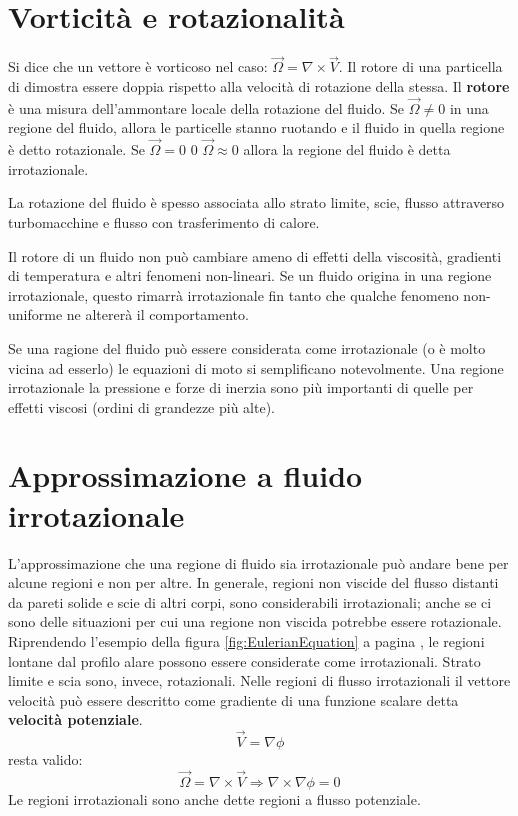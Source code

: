 \section{Vorticità e rotazionalità}
Si dice che un vettore è vorticoso nel caso: $\vec{\Omega} = \nabla \times \vec{V}$. Il rotore di una particella di dimostra essere doppia rispetto alla velocità di rotazione della stessa.
Il \textbf{rotore} è una misura dell'ammontare locale della rotazione del fluido.
Se $\vec{\Omega} \neq 0$ in una regione del fluido, allora le particelle stanno ruotando e il fluido in quella regione è detto rotazionale.
Se $\vec{\Omega} = 0$ 0 $\vec{\Omega} \approx 0$ allora la regione del fluido è detta irrotazionale.

La rotazione del fluido è spesso associata allo strato limite, scie, flusso attraverso turbomacchine e flusso con trasferimento di calore.

Il rotore di un fluido non può cambiare ameno di effetti della viscosità, gradienti di temperatura e altri fenomeni non-lineari.
Se un fluido origina in una regione irrotazionale, questo rimarrà irrotazionale fin tanto che qualche fenomeno non-uniforme ne altererà il comportamento.

Se una ragione del fluido può essere considerata come irrotazionale (o è molto vicina ad esserlo) le equazioni di moto si semplificano notevolmente. Una regione irrotazionale la pressione e forze di inerzia sono più importanti di quelle per effetti viscosi (ordini di grandezze più alte).

\section{Approssimazione a fluido irrotazionale}
L'approssimazione che una regione di fluido sia irrotazionale può andare bene per alcune regioni e non per altre.
In generale, regioni non viscide del flusso distanti da pareti solide e scie di altri corpi, sono considerabili irrotazionali; anche se ci sono delle situazioni per cui una regione non viscida potrebbe essere rotazionale.
Riprendendo l'esempio della figura \ref{fig:EulerianEquation} a pagina \pageref{fig:EulerianEquation}, le regioni lontane dal profilo alare possono essere considerate come irrotazionali. Strato limite e scia sono, invece, rotazionali.
Nelle regioni di flusso irrotazionali il vettore velocità può essere descritto come gradiente di una funzione scalare detta \textbf{velocità potenziale}.
\begin{equation}
\vec{V} = \nabla \phi
\end{equation}
resta valido:
\begin{equation}
\vec{\Omega} = \nabla \times \vec{V} \Rightarrow \nabla \times \nabla \phi = 0
\end{equation}
Le regioni irrotazionali sono anche dette regioni a flusso potenziale.

